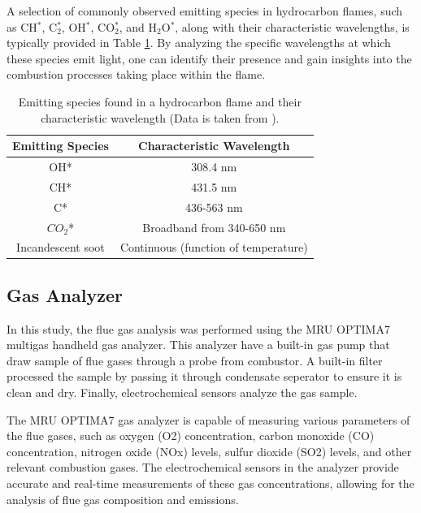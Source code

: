 A selection of commonly observed emitting species in hydrocarbon flames, such as CH$^*$, C$_2^*$, OH$^*$, CO$_2^*$, and H$_2$O$^*$, along with their characteristic wavelengths, is typically provided in Table \ref{Emitting Species}. By analyzing the specific wavelengths at which these species emit light, one can identify their presence and gain insights into the combustion processes taking place within the flame.

\begin{table}[h!]
	\centering
	\begin{tabular}{|c | c |} 
		\hline
		\textbf{Emitting Species} & \textbf{Characteristic Wavelength} \\ [0.5ex] 
		\hline
		OH* & 308.4 nm \\ \hline
        CH* & 431.5 nm \\ \hline
        C* & 436-563 nm \\ \hline
        $CO_2$* & Broadband from 340-650 nm \\ \hline
        Incandescent soot & Continuous (function of temperature) \\ \hline
	\end{tabular}
	\caption[Emitting species found in a hydrocarbon flame and their characteristic wavelength]{Emitting species found in a hydrocarbon flame and their characteristic wavelength (Data is taken from \cite{KARNANI20132275}).}
	\label{Emitting Species}
\end{table}

\subsection{Gas Analyzer}
In this study, the flue gas analysis was performed using the MRU OPTIMA7 multigas handheld gas analyzer. This analyzer have a built-in gas pump that draw sample of flue gases through a probe from combustor. A built-in filter processed the sample by passing it through condensate seperator to ensure it is clean and dry. Finally, electrochemical sensors analyze the gas sample.

The MRU OPTIMA7 gas analyzer is capable of measuring various parameters of the flue gases, such as oxygen (O2) concentration, carbon monoxide (CO) concentration, nitrogen oxide (NOx) levels, sulfur dioxide (SO2) levels, and other relevant combustion gases. The electrochemical sensors in the analyzer provide accurate and real-time measurements of these gas concentrations, allowing for the analysis of flue gas composition and emissions.

